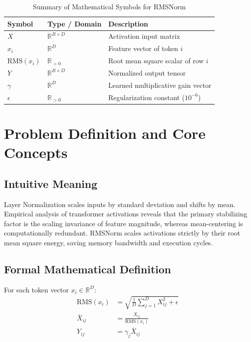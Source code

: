 \documentclass[11pt,a4paper]{article}
\theoremstyle{definition}
\begin{document}
\begin{table}[h]
\centering
\caption{Summary of Mathematical Symbols for RMSNorm}
\begin{tabular}{lll}
\toprule
\textbf{Symbol} & \textbf{Type / Domain} & \textbf{Description} \\
\midrule
$X$ & $\mathbb{R}^{B \times D}$ & Activation input matrix \\
$x_i$ & $\mathbb{R}^D$ & Feature vector of token $i$ \\
$\text{RMS}(x_i)$ & $\mathbb{R}_{> 0}$ & Root mean square scalar of row $i$ \\
$Y$ & $\mathbb{R}^{B \times D}$ & Normalized output tensor \\
$\gamma$ & $\mathbb{R}^D$ & Learned multiplicative gain vector \\
$\epsilon$ & $\mathbb{R}_{> 0}$ & Regularization constant ($10^{-6}$) \\
\bottomrule
\end{tabular}
\end{table}

\section{Problem Definition and Core Concepts}

\subsection{Intuitive Meaning}
Layer Normalization scales inputs by standard deviation and shifts by mean. Empirical analysis of transformer activations reveals that the primary stabilizing factor is the scaling invariance of feature magnitude, whereas mean-centering is computationally redundant. RMSNorm scales activations strictly by their root mean square energy, saving memory bandwidth and execution cycles.

\subsection{Formal Mathematical Definition}
For each token vector $x_i \in \mathbb{R}^D$:
\begin{align}
\text{RMS}(x_i) &= \sqrt{\frac{1}{D} \sum_{j=1}^D X_{ij}^2 + \epsilon} \\
\bar{X}_{ij} &= \frac{X_{ij}}{\text{RMS}(x_i)} \\
Y_{ij} &= \gamma_j \bar{X}_{ij}
\end{align}
\end{document}

